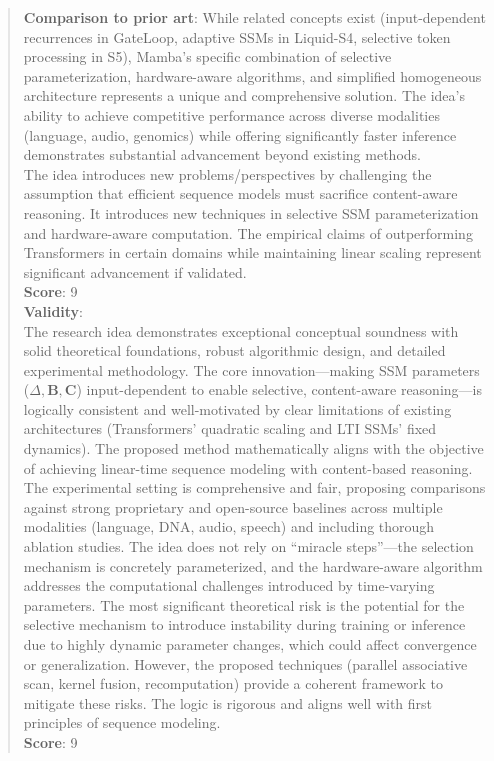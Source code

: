 \begin{quote}
\begin{tcolorbox}[breakable,colback=almond!20!white, colframe=almond!60!black, title=\textbf{Case Study (Mamba: Linear-Time Sequence Modeling with Selective State Spaces)}]
        \textbf{Comparison to prior art}: While related concepts exist (input-dependent recurrences in GateLoop, adaptive SSMs in Liquid-S4, selective token processing in S5), Mamba's specific combination of selective parameterization, hardware-aware algorithms, and simplified homogeneous architecture represents a unique and comprehensive solution. The idea's ability to achieve competitive performance across diverse modalities (language, audio, genomics) while offering significantly faster inference demonstrates substantial advancement beyond existing methods.\\
        The idea introduces new problems/perspectives by challenging the assumption that efficient sequence models must sacrifice content-aware reasoning. It introduces new techniques in selective SSM parameterization and hardware-aware computation. The empirical claims of outperforming Transformers in certain domains while maintaining linear scaling represent significant advancement if validated.\\
        \textbf{Score}: 9\\

        \textbf{Validity}:\\
        The research idea demonstrates exceptional conceptual soundness with solid theoretical foundations, robust algorithmic design, and detailed experimental methodology. The core innovation—making SSM parameters ($\Delta, \boldsymbol{B}, \boldsymbol{C}$) input-dependent to enable selective, content-aware reasoning—is logically consistent and well-motivated by clear limitations of existing architectures (Transformers' quadratic scaling and LTI SSMs' fixed dynamics). The proposed method mathematically aligns with the objective of achieving linear-time sequence modeling with content-based reasoning. The experimental setting is comprehensive and fair, proposing comparisons against strong proprietary and open-source baselines across multiple modalities (language, DNA, audio, speech) and including thorough ablation studies. The idea does not rely on ``miracle steps''—the selection mechanism is concretely parameterized, and the hardware-aware algorithm addresses the computational challenges introduced by time-varying parameters. The most significant theoretical risk is the potential for the selective mechanism to introduce instability during training or inference due to highly dynamic parameter changes, which could affect convergence or generalization. However, the proposed techniques (parallel associative scan, kernel fusion, recomputation) provide a coherent framework to mitigate these risks. The logic is rigorous and aligns well with first principles of sequence modeling.\\
        \textbf{Score}: 9\\


\end{tcolorbox}
\end{quote}
